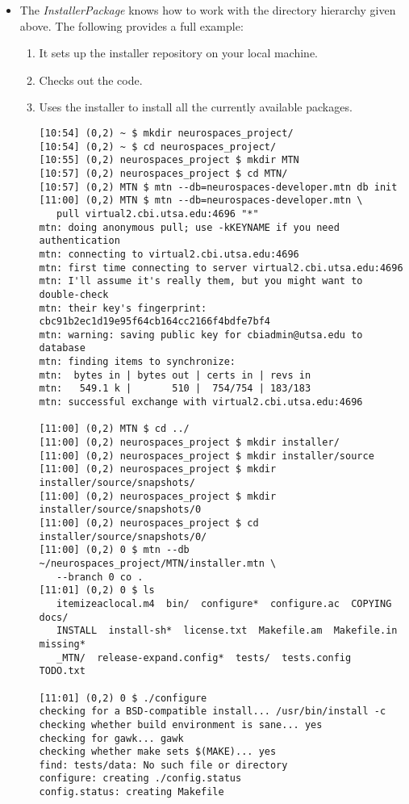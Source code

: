 \documentclass[12pt]{article}
\begin{document}
\begin{itemize}
\item The {\it InstallerPackage} knows how to work with the directory hierarchy given above. The following provides a full example:

\begin{enumerate}
\item It sets up the installer repository on your local machine.
\item Checks out the code.
\item Uses the installer to install all the currently available packages.
\begin{verbatim}
[10:54] (0,2) ~ $ mkdir neurospaces_project/
[10:54] (0,2) ~ $ cd neurospaces_project/
[10:55] (0,2) neurospaces_project $ mkdir MTN
[10:57] (0,2) neurospaces_project $ cd MTN/
[10:57] (0,2) MTN $ mtn --db=neurospaces-developer.mtn db init
[11:00] (0,2) MTN $ mtn --db=neurospaces-developer.mtn \
   pull virtual2.cbi.utsa.edu:4696 "*"
mtn: doing anonymous pull; use -kKEYNAME if you need authentication
mtn: connecting to virtual2.cbi.utsa.edu:4696
mtn: first time connecting to server virtual2.cbi.utsa.edu:4696
mtn: I'll assume it's really them, but you might want to double-check
mtn: their key's fingerprint: cbc91b2ec1d19e95f64cb164cc2166f4bdfe7bf4
mtn: warning: saving public key for cbiadmin@utsa.edu to database
mtn: finding items to synchronize:
mtn:  bytes in | bytes out | certs in | revs in
mtn:   549.1 k |       510 |  754/754 | 183/183
mtn: successful exchange with virtual2.cbi.utsa.edu:4696

[11:00] (0,2) MTN $ cd ../
[11:00] (0,2) neurospaces_project $ mkdir installer/
[11:00] (0,2) neurospaces_project $ mkdir installer/source
[11:00] (0,2) neurospaces_project $ mkdir installer/source/snapshots/
[11:00] (0,2) neurospaces_project $ mkdir installer/source/snapshots/0
[11:00] (0,2) neurospaces_project $ cd installer/source/snapshots/0/
[11:00] (0,2) 0 $ mtn --db ~/neurospaces_project/MTN/installer.mtn \
   --branch 0 co .
[11:01] (0,2) 0 $ ls
   itemizeaclocal.m4  bin/  configure*  configure.ac  COPYING  docs/ 
   INSTALL  install-sh*  license.txt  Makefile.am  Makefile.in  missing* 
   _MTN/  release-expand.config*  tests/  tests.config  TODO.txt

[11:01] (0,2) 0 $ ./configure 
checking for a BSD-compatible install... /usr/bin/install -c
checking whether build environment is sane... yes
checking for gawk... gawk
checking whether make sets $(MAKE)... yes
find: tests/data: No such file or directory
configure: creating ./config.status
config.status: creating Makefile


\end{verbatim}
\end{enumerate}
\end{itemize}
\end{document}
